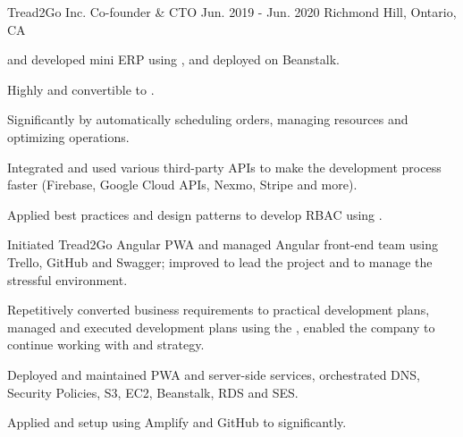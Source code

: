 \begin{cventries}
  \cventry
    {Tread2Go Inc.} %
    {Co-founder \& CTO} %
    {Jun. 2019 - Jun. 2020} %
    {Richmond Hill, Ontario, CA} %
    {
      \begin{cvitems} %
        \item { and developed mini ERP  using ,  and deployed on  Beanstalk.}
          \begin{cvsubitems}
            \item {Highly  and convertible to .}
            \item {Significantly  by automatically scheduling orders, managing resources and optimizing operations.}
            \item {Integrated and used various third-party APIs to make the development process faster  (Firebase, Google Cloud APIs, Nexmo, Stripe and more).}
            \item {Applied best practices and design patterns to develop RBAC using .}
          \end{cvsubitems}
        \item {Initiated Tread2Go Angular PWA and managed Angular front-end team using Trello, GitHub and Swagger; improved  to lead the project and  to manage the stressful environment.}
          \begin{cvsubitems}
            \item {Repetitively converted business requirements to practical development plans, managed and executed development plans using the , enabled the company to continue working with  and  strategy.}
          \end{cvsubitems}
        \item {Deployed and maintained PWA and server-side services, orchestrated DNS, Security Policies, S3, EC2, Beanstalk, RDS and SES.}
          \begin{cvsubitems}
            \item {Applied and setup  using Amplify and GitHub to  significantly.}
          \end{cvsubitems}
      \end{cvitems}
    }


\end{cventries}
